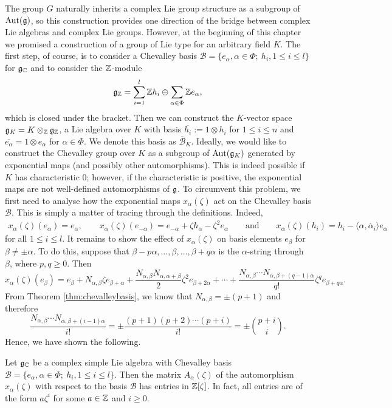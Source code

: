 The group $G$ naturally inherits a complex Lie group structure as a subgroup of $\mathrm{Aut}(\mathfrak{g})$, so this construction provides one direction of the bridge between complex Lie algebras and complex Lie groups. However, at the beginning of this chapter we promised a construction of a group of Lie type for an arbitrary field $K$. The first step, of course, is to consider a Chevalley basis $\mathcal{B}=\{e_\alpha,\alpha\in\Phi;\ h_i,1\leq i\leq l\}$ for $\mathfrak{g}_{\mathbb{C}}$ and to consider the $\mathbb{Z}$-module 
$$\mathfrak{g}_{\mathbb{Z}}=\sum_{i=1}^l\mathbb{Z} h_i\oplus\sum_{\alpha\in\Phi}\mathbb{Z} e_\alpha,$$
which is closed under the bracket. Then we can construct the $K$-vector space $\mathfrak{g}_K=K\otimes_{\mathbb{Z}}\mathfrak{g}_{\mathbb{Z}}$, a Lie algebra over $K$ with basis $\overline{h_i}:=1\otimes h_i$ for $1\leq i\leq n$ and $\overline{e_\alpha}=1\otimes e_\alpha$ for $\alpha\in\Phi$. We denote this basis as $\overline{\mathcal{B}}_K$. Ideally, we would like to construct the Chevalley group over $K$ as a subgroup of $\mathrm{Aut}(\mathfrak{g}_K)$ generated by exponential maps (and possibly other automorphisms). This is indeed possible if $K$ has characteristic $0$; however, if the characteristic is positive, the exponential maps are not well-defined automorphisms of $\mathfrak{g}$. To circumvent this problem, we first need to analyse how the exponential maps $x_\alpha(\zeta)$ act on the Chevalley basis $\mathcal{B}$. This is simply a matter of tracing through the definitions. Indeed, 
\begin{align*}
    x_\alpha(\zeta)(e_\alpha)=e_\alpha, \quad\quad x_\alpha(\zeta)(e_{-\alpha})=e_{-\alpha}+\zeta h_\alpha-\zeta^2 e_\alpha\quad\quad\text{and}\quad\quad x_\alpha(\zeta)(h_i)=h_i-\langle\alpha,\check{\alpha_i}\rangle e_\alpha
\end{align*}
for all $1\leq i\leq l$. It remains to show the effect of $x_\alpha(\zeta)$ on basis elements $e_\beta$ for $\beta\neq\pm\alpha$. To do this, suppose that $\beta-p\alpha,\ldots,\beta,\ldots,\beta+q\alpha$ is the $\alpha$-string through $\beta$, where $p,q\geq 0$. Then
$$x_\alpha(\zeta)(e_\beta)=e_\beta+N_{\alpha,\beta}\zeta e_{\beta+\alpha}+\frac{N_{\alpha,\beta}N_{\alpha,\alpha+\beta}}{2}\zeta^2 e_{\beta+2\alpha}+\cdots+\frac{N_{\alpha,\beta}\cdots N_{\alpha,\beta+(q-1)\alpha}}{q!}\zeta^q e_{\beta+q\alpha}.$$
From Theorem \ref{thm:chevalleybasis}, we know that $N_{\alpha,\beta}=\pm(p+1)$ and therefore
$$\frac{N_{\alpha,\beta}\cdots N_{\alpha,\beta+(i-1)\alpha}}{i!}=\pm\frac{(p+1)(p+2)\cdots(p+i)}{i!}=\pm \binom{p+i}{i}.$$
Hence, we have shown the following.
\begin{proposition}
    Let $\mathfrak{g}_{\mathbb{C}}$ be a complex simple Lie algebra with Chevalley basis $\mathcal{B}=\{e_\alpha,\alpha\in\Phi;\ h_i,1\leq i\leq l\}$. Then the matrix $A_\alpha(\zeta)$ of the automorphism $x_\alpha(\zeta)$ with respect to the basis $\mathcal{B}$ has entries in $\mathbb{Z}[\zeta]$. In fact, all entries are of the form $a\zeta^i$ for some $a\in\mathbb{Z}$ and $i\geq0$. 
\end{proposition}

